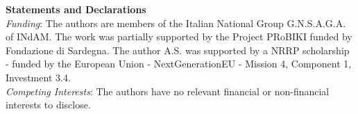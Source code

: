 \documentclass[11pt]{amsart}
\theoremstyle{plain}
\theoremstyle{definition}
\numberwithin{equation}{section}
\numberwithin{equation}{section}
\begin{document}
{\bf Statements and Declarations}\\

{\em Funding}: The authors are members of the Italian National Group G.N.S.A.G.A. of INdAM. The work was partially supported by the Project {PRoBIKI} funded by Fondazione di Sardegna.  The author A.S. was supported by a NRRP scholarship - funded by the European Union - NextGenerationEU - Mission 4, Component 1, 
Investment 3.4.\\

{\em Competing Interests}: The authors have no relevant financial or non-financial interests to disclose.
\end{document}
